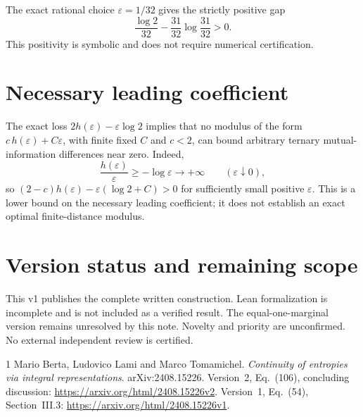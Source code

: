 \documentclass[11pt,a4paper]{article}
\newcommand{\eps}{\varepsilon}
\begin{document}
The exact rational choice $\eps=1/32$ gives the strictly positive gap
\begin{equation}
\frac{\log2}{32}-\frac{31}{32}\log\frac{31}{32}>0.
\end{equation}
This positivity is symbolic and does not require numerical certification.

\section{Necessary leading coefficient}
The exact loss $2h(\eps)-\eps\log2$ implies that no modulus of the form $c\,h(\eps)+C\eps$, with finite fixed $C$ and $c<2$, can bound arbitrary ternary mutual-information differences near zero. Indeed,
\begin{equation}
\frac{h(\eps)}{\eps}\ge-\log\eps\longrightarrow+\infty\qquad(\eps\downarrow0),
\end{equation}
so $(2-c)h(\eps)-\eps(\log2+C)>0$ for sufficiently small positive $\eps$. This is a lower bound on the necessary leading coefficient; it does not establish an exact optimal finite-distance modulus.

\section{Version status and remaining scope}
This v1 publishes the complete written construction. Lean formalization is incomplete and is not included as a verified result. The equal-one-marginal version remains unresolved by this note. Novelty and priority are unconfirmed. No external independent review is certified.

\begin{thebibliography}{1}
 Mario Berta, Ludovico Lami and Marco Tomamichel.
\emph{Continuity of entropies via integral representations}.
arXiv:2408.15226. Version~2, Eq.~(106), concluding discussion:
\url{https://arxiv.org/html/2408.15226v2}.
Version~1, Eq.~(54), Section~III.3:
\url{https://arxiv.org/html/2408.15226v1}.
\end{thebibliography}
\end{document}
